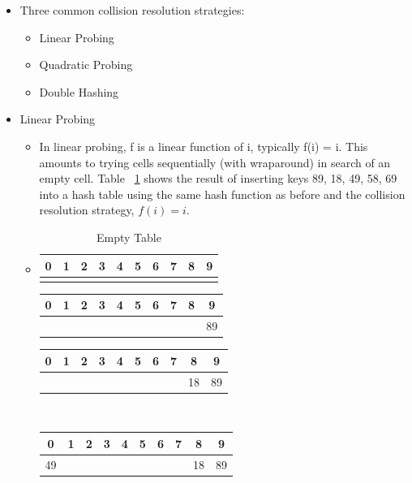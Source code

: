 \documentclass[a4paper,oneside]{book}
\begin{document}
\begin{itemize}
\item Three common collision resolution strategies:\begin{itemize}
\item Linear Probing
\item Quadratic Probing
\item Double Hashing
\end{itemize}
\item Linear Probing\begin{itemize}
\item In linear probing, f is a linear function of i, typically f(i) = i. This amounts to trying cells
sequentially (with wraparound) in search of an empty cell. Table
~\ref{HashKeyLinearProbing} shows the result of inserting keys {89, 18, 49, 58, 69} into a hash table using the same hash function as before
and the collision resolution strategy, $f(i) = i$.
\item \begin{table}
\centering
\caption{Empty Table}
\label{HashKeyLinearProbing}
\begin{tabular}{|cccccccccc|}
\hline
0 & 1 & 2 & 3 & 4 & 5 & 6 & 7 & 8 & 9\\ \hline
& & & & & & & & & \\ \hline
\end{tabular}
\end{table}
\begin{tabular}[H]{|cccccccccc|}
\hline
0 & 1 & 2 & 3 & 4 & 5 & 6 & 7 & 8 & 9\\ \hline
& & & & & & & & & 89\\ \hline
\end{tabular}
\begin{tabular}[H]{|cccccccccc|}
\hline
0 & 1 & 2 & 3 & 4 & 5 & 6 & 7 & 8 & 9\\ \hline
& & & & & & & & 18 & 89\\ \hline
\end{tabular}\\
\begin{tabular}[H]{|cccccccccc|}
\hline
0 & 1 & 2 & 3 & 4 & 5 & 6 & 7 & 8 & 9\\ \hline
49 &  & & & & & & & 18 & 89\\ \hline
\end{tabular}

\end{itemize}
\end{itemize}
\end{document}
